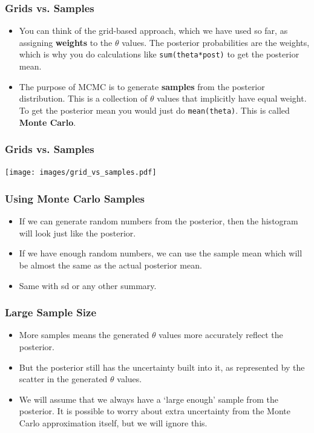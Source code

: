 \documentclass{beamer}
\begin{document}
\begin{frame}[fragile]
\frametitle{Grids vs. Samples}
\begin{itemize}
\item You can think of the grid-based approach, which we have used so far,
as assigning {\bf weights} to the $\theta$ values. The posterior probabilities
are the weights, which is why you do calculations like
\texttt{sum(theta*post)} to get the posterior mean.\pause
\item The purpose of MCMC is to generate {\bf samples} from the posterior
distribution. This is a collection of $\theta$ values that implicitly have
equal weight. To get the posterior mean you would just do \texttt{mean(theta)}.
This is called {\bf Monte Carlo}.
\end{itemize}


\end{frame}


\begin{frame}[fragile]
\frametitle{Grids vs. Samples}
\centering
\texttt{[image: images/grid\_vs\_samples.pdf]}

\end{frame}

\begin{frame}
\frametitle{Using Monte Carlo Samples}
\begin{itemize}
\item If we can generate random numbers from the
posterior, then the histogram will look just like the posterior.\pause
\item If we have enough random numbers, we can use the
sample mean which will be almost the same as the
actual posterior mean.\pause
\item Same with sd or any other summary.
\end{itemize}

\end{frame}

\begin{frame}
\frametitle{Large Sample Size}

\begin{itemize}
\item More samples means the generated $\theta$ values more accurately
reflect the posterior.\pause
\item But the posterior still has the uncertainty built into it, as represented
by the scatter in the generated $\theta$ values.\pause
\item We will assume that we always have a `large enough'
sample from the posterior. It is possible to worry about extra
uncertainty from the Monte Carlo approximation itself, but we will ignore this.
\end{itemize}

\end{frame}
\end{document}
